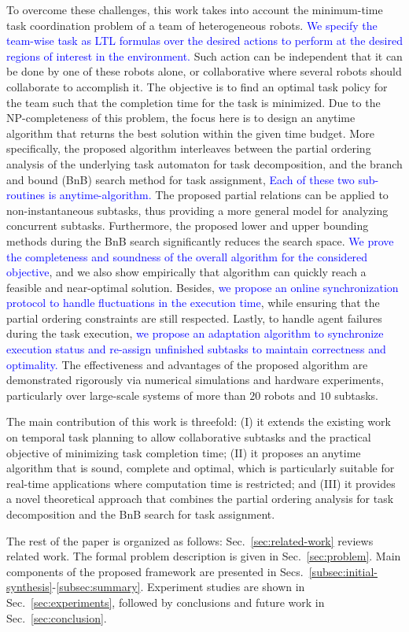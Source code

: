 To overcome these challenges,
this work takes into account the minimum-time task coordination problem of a team of heterogeneous robots.
\textcolor{blue}{We specify the team-wise task as LTL formulas over the desired actions to perform at the
desired regions of interest in the environment.}
Such action can be independent that it can be done by one of these robots alone,
or collaborative where several robots should collaborate to accomplish it.
The objective is to find an optimal task policy for the team such that the completion time for the task is minimized.
Due to the NP-completeness of this problem,
the focus here is to design an anytime algorithm that returns the best solution within the given time budget.
More specifically,
the proposed algorithm interleaves between the partial ordering analysis
of the underlying task automaton for task decomposition,
and the branch and bound (BnB) search method for task assignment,
\textcolor{blue}{Each of these two sub-routines is anytime-algorithm.}
The proposed partial relations can be applied to non-instantaneous subtasks,
thus providing a more general model for analyzing concurrent subtasks.
Furthermore, the proposed lower and upper bounding methods during the BnB search
significantly reduces the search space.
\textcolor{blue}{We prove the completeness and soundness of the overall algorithm for the considered objective},
and we also show empirically that algorithm can quickly reach a feasible and near-optimal solution.
Besides,
\textcolor{blue}{we propose an online synchronization protocol to handle fluctuations in the execution time},
while ensuring that the partial ordering constraints are still respected.
Lastly, to handle agent failures during the task execution,
\textcolor{blue}{we propose an adaptation algorithm to synchronize execution
status and re-assign unfinished subtasks
to maintain correctness and optimality.}
The effectiveness and advantages of the proposed algorithm
are demonstrated rigorously via numerical simulations and hardware experiments,
particularly over {large-scale} systems of more than $20$ robots and $10$ subtasks.


The main contribution of this work is threefold:
(I) it extends the existing work on temporal task planning to allow collaborative subtasks
and the practical objective of minimizing task completion time;
(II) it proposes an anytime algorithm that is sound, complete and optimal,
which is particularly suitable for real-time applications where computation time is restricted;
and (III) it provides a novel theoretical approach that combines the partial ordering
analysis for task decomposition and the BnB search for task assignment.

The rest of the paper is organized as follows:
Sec.~\ref{sec:related-work} reviews related work.
The formal problem description is given in Sec.~\ref{sec:problem}.
Main components of the proposed framework are presented in
Secs.~\ref{subsec:initial-synthesis}-\ref{subsec:summary}.
Experiment studies are shown in Sec.~\ref{sec:experiments},
followed by conclusions and future work in Sec.~\ref{sec:conclusion}.
